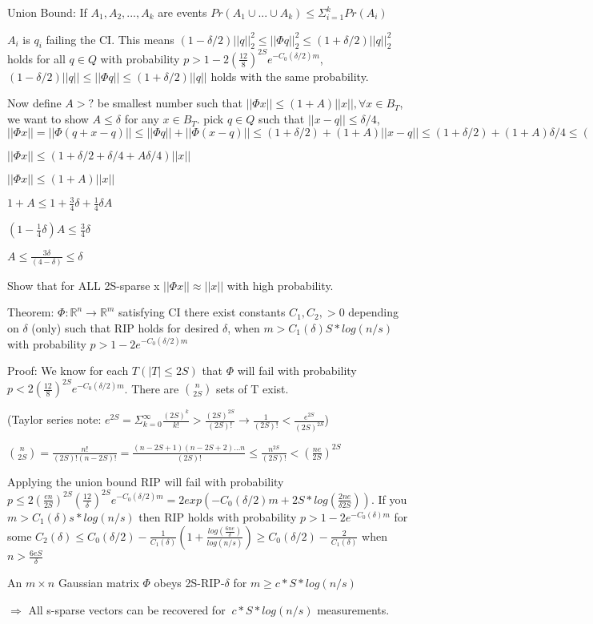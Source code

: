 \documentclass[12pt,letterpaper]{report}
\begin{document}
Union Bound: If $A_1, A_2, ..., A_k$ are events $Pr(A_1 \cup ... \cup A_k) \leq \Sigma_{i=1}^k Pr(A_i)$

$A_i$ is $q_i$ failing the CI.  This means $(1-\delta/2)||q||_2^2 \leq ||\Phi q||_2^2 \leq (1+\delta/2)||q||_2^2$ holds for all $q \in Q$ with probability $ p > 1 - 2(\frac{12}{8})^{2S}e^{-C_0(\delta/2)m}$, $(1-\delta/2)||q|| \leq ||\Phi q|| \leq (1+\delta/2)||q||$ holds with the same probability.

Now define $A > ?$ be smallest number such that $||\Phi x|| \leq (1+A)||x||, \forall x \in B_T$, we want to show $A \leq \delta$ for any $x \in B_T$. pick $q \in Q$ such that $||x - q|| \leq \delta/4$, $||\Phi x|| = ||\Phi (q + x - q)|| \leq ||\Phi q|| + ||\Phi(x-q)|| \leq (1 + \delta/2) + (1 + A)||x-q|| \leq (1 + \delta/2) + (1+A) \delta/4 \leq ((1 + \delta/2) + (1+A) \delta/4)||x||$

$||\Phi x|| \leq (1 + \delta/2 + \delta/4 + A \delta/4)||x||$

$||\Phi x|| \leq (1 + A)||x||$


$1+A \leq 1 + \frac{3}{4} \delta + \frac{1}{4} \delta A$

$(1 - \frac{1}{4} \delta) A \leq \frac{3}{4} \delta $

$A \leq \frac{3\delta}{(4-\delta)} \leq \delta$


Show that for ALL 2S-sparse x $||\Phi x|| \approx ||x||$ with high probability.

Theorem: $\Phi : \mathbb{R}^n \rightarrow \mathbb{R}^m$ satisfying CI there exist constants $C_1, C_2, > 0$ depending on $\delta$ (only) such that RIP holds for desired $\delta$, when $m > C_1(\delta) S * log(n/s)$ with probability $p > 1 - 2e^{-C_0(\delta/2)m}$

Proof: We know for each $T(|T| \leq 2S)$ that $\Phi$ will fail with probability $p < 2(\frac{12}{8})^{2S}e^{-C_0(\delta/2)m}$.  There are ${n \choose 2S}$ sets of T exist.

(Taylor series note: $e^{2S} = \Sigma_{k=0}^\infty \frac{(2S)^k}{k!} > \frac{(2S)^{2S}}{(2S)!} \rightarrow \frac{1}{(2S)!} < \frac{e^{2S}}{(2S)^{2S}}$)

${n \choose 2S} = \frac{n!}{(2S)!(n-2S)!} = \frac{(n-2S+1)(n-2S+2)...n}{(2S)!} \leq \frac{n^{2S}}{(2S)!} < (\frac{n e}{2S})^{2S}$ 


Applying the union bound RIP will fail with probability $p \leq 2(\frac{en}{2S})^{2S}(\frac{12}{\delta})^{2S}e^{-C_0(\delta/2)m} = 2 exp(-C_0(\delta/2)m + 2S*log(\frac{2ne}{\delta 2 S}))$.  If you $m > C_1(\delta)s*log(n/s)$ then RIP holds with probability $p > 1 - 2 e^{-C_0(\delta)m}$ for some $C_2(\delta) \leq C_0(\delta/2) - \frac{1}{C_1(\delta)}( 1 + \frac{log(\frac{6ne}{\delta})}{log(n/s)}) \geq C_0(\delta/2) - \frac{2}{C_1(\delta)}$ when $n > \frac{6eS}{\delta}$

An $m \times n$ Gaussian matrix $\Phi$ obeys 2S-RIP-$\delta$ for $m \geq c * S * log(n/s)$ 

$\Rightarrow$ All s-sparse vectors can be recovered for $~c*S*log(n/s)$ measurements.
\end{document}
